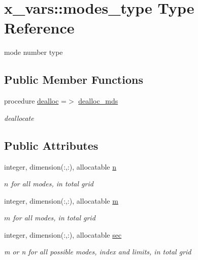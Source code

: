 \hypertarget{structx__vars_1_1modes__type}{}\section{x\+\_\+vars\+:\+:modes\+\_\+type Type Reference}
\label{structx__vars_1_1modes__type}


mode number type  


\subsection*{Public Member Functions}
\begin{DoxyCompactItemize}
\item 
procedure \hyperlink{structx__vars_1_1modes__type_a7e5a5911553ebec13c9b86014be7d78e}{dealloc} =$>$ \hyperlink{namespacex__vars_a4a7e4b95bbcb90e8afb4985fc9456e67}{dealloc\+\_\+mds}
\begin{DoxyCompactList}\small\item\em deallocate \end{DoxyCompactList}\end{DoxyCompactItemize}
\subsection*{Public Attributes}
\begin{DoxyCompactItemize}
\item 
integer, dimension(\+:,\+:), allocatable \hyperlink{structx__vars_1_1modes__type_ab6d49ba52a26dd5d76685cc605e16ec0}{n}
\begin{DoxyCompactList}\small\item\em $n$ for all modes, in total grid \end{DoxyCompactList}\item 
integer, dimension(\+:,\+:), allocatable \hyperlink{structx__vars_1_1modes__type_a75bcb0fb494d2e896553502ab67499ff}{m}
\begin{DoxyCompactList}\small\item\em $m$ for all modes, in total grid \end{DoxyCompactList}\item 
integer, dimension(\+:,\+:), allocatable \hyperlink{structx__vars_1_1modes__type_acf880c5c3f78457cd4d40a3adf410eb7}{sec}
\begin{DoxyCompactList}\small\item\em {\ttfamily m} or {\ttfamily n} for all possible modes, index and limits, in total grid \end{DoxyCompactList}\end{DoxyCompactItemize}



